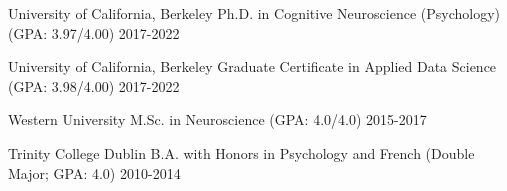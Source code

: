 
\begin{cvhonors}

 \cvhonor
    {University of California, Berkeley} %
    {Ph.D. in Cognitive Neuroscience (Psychology) (GPA: 3.97/4.00)}
    {} %
  	{2017-2022}
  	
 \cvhonor
    {University of California, Berkeley} %
    {Graduate Certificate in Applied Data Science (GPA: 3.98/4.00)}
    {} %
  	{2017-2022}
  	
 \cvhonor
    {Western University} %
    {M.Sc. in  Neuroscience (GPA: 4.0/4.0)}
    {} %
  	{2015-2017}
  	
 \cvhonor
    {Trinity College Dublin} %
    {B.A. with Honors in Psychology and French (Double Major; GPA: 4.0)}
    {} %
  	{2010-2014}
  	
\end{cvhonors}





